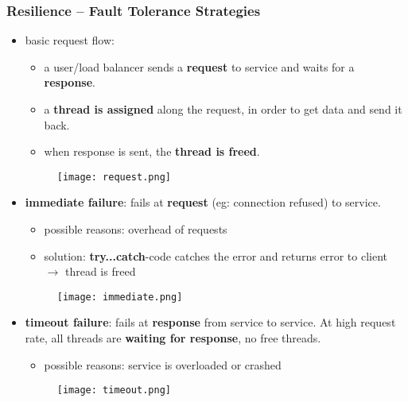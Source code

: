 \subsubsection{Resilience -- Fault Tolerance Strategies}
\begin{itemize}
	\item basic request flow: 
	\begin{itemize}
		\item a user/load balancer sends a \textbf{request} to service and waits for a \textbf{response}.
		\item a \textbf{thread is assigned} along the request, in order to get data and send it back.
		\item when response is sent, the \textbf{thread is freed}. 
	\end{itemize}
	\begin{figure}[H]
		\centering
		\texttt{[image: request.png]}
	\end{figure}
	\item \textbf{immediate failure}: fails at \textbf{request} (eg: connection refused) to service.
	\begin{itemize}
		\item possible reasons: overhead of requests
		\item solution: \textbf{try...catch}-code catches the error and returns error to client $\rightarrow$ thread is freed		
	\end{itemize}
	\begin{figure}[H]
		\centering
		\texttt{[image: immediate.png]}
	\end{figure}
	
	
	\item \textbf{timeout failure}: fails at \textbf{response} from service to service. At high request rate, all threads are \textbf{waiting for response}, no free threads.
	\begin{itemize}
		\item possible reasons: service is overloaded or crashed
		
	\end{itemize}
	\begin{figure}[H]
		\centering
		\texttt{[image: timeout.png]}
	\end{figure}
	

\end{itemize}
